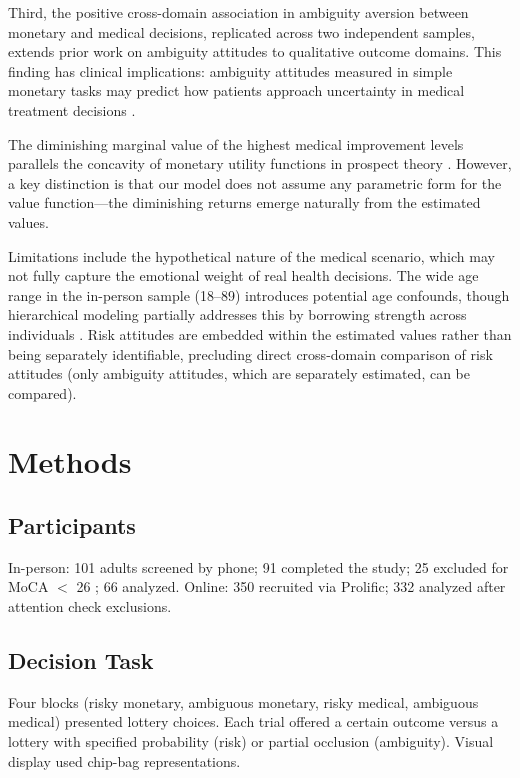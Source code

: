 \documentclass[11pt]{article}
\begin{document}
Third, the positive cross-domain association in ambiguity aversion between monetary and medical decisions, replicated across two independent samples, extends prior work on ambiguity attitudes \citep{levy2010neural, tymula2012ambiguity, tymula2013like} to qualitative outcome domains. This finding has clinical implications: ambiguity attitudes measured in simple monetary tasks may predict how patients approach uncertainty in medical treatment decisions \citep{behrens2007learning}.

The diminishing marginal value of the highest medical improvement levels parallels the concavity of monetary utility functions in prospect theory \citep{kahneman1979prospect}. However, a key distinction is that our model does not assume any parametric form for the value function---the diminishing returns emerge naturally from the estimated values.

Limitations include the hypothetical nature of the medical scenario, which may not fully capture the emotional weight of real health decisions. The wide age range in the in-person sample (18--89) introduces potential age confounds, though hierarchical modeling partially addresses this by borrowing strength across individuals \citep{gelman2013bayesian}. Risk attitudes are embedded within the estimated values rather than being separately identifiable, precluding direct cross-domain comparison of risk attitudes (only ambiguity attitudes, which are separately estimated, can be compared).

\section{Methods}

\subsection{Participants}
In-person: 101 adults screened by phone; 91 completed the study; 25 excluded for MoCA $<$ 26 \citep{nasreddine2005moca}; 66 analyzed. Online: 350 recruited via Prolific; 332 analyzed after attention check exclusions.

\subsection{Decision Task}
Four blocks (risky monetary, ambiguous monetary, risky medical, ambiguous medical) presented lottery choices. Each trial offered a certain outcome versus a lottery with specified probability (risk) or partial occlusion (ambiguity). Visual display used chip-bag representations.
\end{document}
